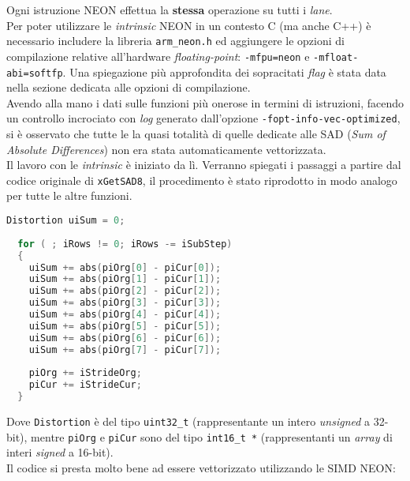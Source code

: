 Ogni istruzione NEON effettua la \textbf{stessa} operazione su tutti i 
\emph{lane}.\\

Per poter utilizzare le \emph{intrinsic} NEON in un contesto C (ma anche C++) è 
necessario includere la libreria \verb|arm_neon.h| ed aggiungere le opzioni di 
compilazione relative all'hardware \emph{floating-point}: \verb|-mfpu=neon| e 
\verb|-mfloat-abi=softfp|. Una spiegazione più approfondita dei sopracitati 
\emph{flag} è stata data nella sezione dedicata alle opzioni di compilazione.\\

Avendo alla mano i dati sulle funzioni più onerose in termini di istruzioni, 
facendo un controllo incrociato con \emph{log} generato dall'opzione 
\verb|-fopt-info-vec-optimized|, si è osservato che tutte le la quasi totalità 
di quelle dedicate alle SAD (\emph{Sum of Absolute Differences}) non era stata 
automaticamente vettorizzata.\\

Il lavoro con le \emph{intrinsic} è iniziato da lì. Verranno spiegati i 
passaggi a partire dal codice originale di \verb|xGetSAD8|, il procedimento è 
stato riprodotto in modo analogo per tutte le altre funzioni.\\

\begin{lstlisting}[language=C]
  Distortion uiSum = 0;
  
  for ( ; iRows != 0; iRows -= iSubStep)
  {
    uiSum += abs(piOrg[0] - piCur[0]);
    uiSum += abs(piOrg[1] - piCur[1]);
    uiSum += abs(piOrg[2] - piCur[2]);
    uiSum += abs(piOrg[3] - piCur[3]);
    uiSum += abs(piOrg[4] - piCur[4]);
    uiSum += abs(piOrg[5] - piCur[5]);
    uiSum += abs(piOrg[6] - piCur[6]);
    uiSum += abs(piOrg[7] - piCur[7]);
    
    piOrg += iStrideOrg;
    piCur += iStrideCur;
  }
\end{lstlisting}

Dove \verb|Distortion| è del tipo \verb|uint32_t| (rappresentante un intero 
\emph{unsigned} a 32-bit), mentre \verb|piOrg| e \verb|piCur| sono del tipo 
\verb|int16_t *| (rappresentanti un \emph{array} di interi \emph{signed} a 
16-bit).\\

Il codice si presta molto bene ad essere vettorizzato utilizzando le SIMD NEON:

